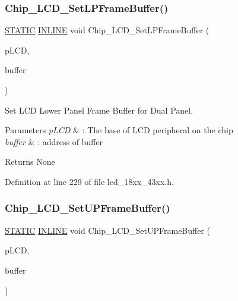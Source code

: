 \subsubsection{\texorpdfstring{Chip\+\_\+\+L\+C\+D\+\_\+\+Set\+L\+P\+Frame\+Buffer()}{Chip\_LCD\_SetLPFrameBuffer()}}
{\footnotesize\ttfamily \hyperlink{group___l_p_c___types___public___macros_ga10b2d890d871e1489bb02b7e70d9bdfb}{S\+T\+A\+T\+IC} \hyperlink{spifi__18xx__43xx_8h_a2eb6f9e0395b47b8d5e3eeae4fe0c116}{I\+N\+L\+I\+NE} void Chip\+\_\+\+L\+C\+D\+\_\+\+Set\+L\+P\+Frame\+Buffer (\begin{DoxyParamCaption}\item[{\hyperlink{struct_l_p_c___l_c_d___t}{L\+P\+C\+\_\+\+L\+C\+D\+\_\+T} $\ast$}]{p\+L\+CD,  }\item[{void $\ast$}]{buffer }\end{DoxyParamCaption})}



Set L\+CD Lower Panel Frame Buffer for Dual Panel. 


\begin{DoxyParams}{Parameters}
{\em p\+L\+CD} & \+: The base of L\+CD peripheral on the chip \\
\hline
{\em buffer} & \+: address of buffer \\
\hline
\end{DoxyParams}
\begin{DoxyReturn}{Returns}
None 
\end{DoxyReturn}


Definition at line 229 of file lcd\+\_\+18xx\+\_\+43xx.\+h.

\mbox{\label{group___l_c_d__18_x_x__43_x_x_ga86f17bd80f2c8694226942d7fb44fcfc}} 
\subsubsection{\texorpdfstring{Chip\+\_\+\+L\+C\+D\+\_\+\+Set\+U\+P\+Frame\+Buffer()}{Chip\_LCD\_SetUPFrameBuffer()}}
{\footnotesize\ttfamily \hyperlink{group___l_p_c___types___public___macros_ga10b2d890d871e1489bb02b7e70d9bdfb}{S\+T\+A\+T\+IC} \hyperlink{spifi__18xx__43xx_8h_a2eb6f9e0395b47b8d5e3eeae4fe0c116}{I\+N\+L\+I\+NE} void Chip\+\_\+\+L\+C\+D\+\_\+\+Set\+U\+P\+Frame\+Buffer (\begin{DoxyParamCaption}\item[{\hyperlink{struct_l_p_c___l_c_d___t}{L\+P\+C\+\_\+\+L\+C\+D\+\_\+T} $\ast$}]{p\+L\+CD,  }\item[{void $\ast$}]{buffer }\end{DoxyParamCaption})}



